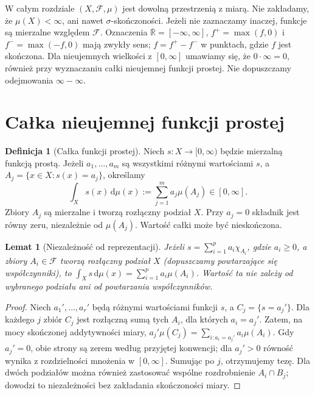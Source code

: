 \documentclass[11pt,a4paper,oneside]{book}
\numberwithin{equation}{chapter}
\theoremstyle{plain}
\newtheorem{lemat}[twierdzenie]{Lemat}
\theoremstyle{definition}
\newtheorem{definicja}[twierdzenie]{Definicja}
\theoremstyle{remark}
\begin{document}
W całym rozdziale $(X,\mathcal F,\mu)$ jest dowolną przestrzenią
z miarą. Nie zakładamy, że $\mu(X)<\infty$, ani nawet
$\sigma$-skończoności. Jeżeli nie zaznaczamy inaczej,
funkcje są mierzalne względem $\mathcal F$.
Oznaczenia $\overline{\mathbb R}=[-\infty,\infty]$,
$f^+=\max(f,0)$ i $f^-=\max(-f,0)$ mają zwykły sens;
$f=f^+-f^-$ w punktach, gdzie $f$ jest skończona.
Dla nieujemnych wielkości z $[0,\infty]$ umawiamy się,
że $0\cdot\infty=0$, również przy wyznaczaniu całki
nieujemnej funkcji prostej. Nie dopuszczamy odejmowania
$\infty-\infty$.

\section{Całka nieujemnej funkcji prostej}

\begin{definicja}[Całka funkcji prostej]
\label{def:integral-simple}
Niech $s:X\to[0,\infty)$ będzie mierzalną funkcją prostą.
Jeżeli $a_1,\ldots,a_m$ są wszystkimi różnymi wartościami $s$,
a $A_j=\{x\in X:s(x)=a_j\}$, określamy
\begin{equation}\label{eq:simple-integral}
\int_X s(x)\,\mathrm d\mu(x)
:=\sum_{j=1}^{m}a_j\mu(A_j)\in[0,\infty].
\end{equation}
Zbiory $A_j$ są mierzalne i tworzą rozłączny podział $X$.
Przy $a_j=0$ składnik jest równy zeru, niezależnie od
$\mu(A_j)$. Wartość całki może być nieskończona.
\end{definicja}

\begin{lemat}[Niezależność od reprezentacji]
\label{lem:simple-refinement}
Jeżeli $s=\sum_{i=1}^p a_i\chi_{A_i}$, gdzie
$a_i\ge0$, a zbiory $A_i\in\mathcal F$ tworzą
rozłączny podział $X$ (dopuszczamy powtarzające się
współczynniki), to
$\int_Xs\,\mathrm d\mu(x)=\sum_{i=1}^pa_i\mu(A_i)$.
Wartość ta nie zależy od wybranego podziału ani od
powtarzania współczynników.
\end{lemat}
\begin{proof}
Niech $a_1',\ldots,a_r'$ będą różnymi wartościami
funkcji $s$, a $C_j=\{s=a_j'\}$. Dla każdego $j$
zbiór $C_j$ jest rozłączną sumą tych $A_i$, dla których
$a_i=a_j'$. Zatem, na mocy skończonej addytywności miary,
$a_j'\mu(C_j)=\sum_{i:a_i=a_j'}a_i\mu(A_i)$.
Gdy $a_j'=0$, obie strony są zerem według przyjętej
konwencji; dla $a_j'>0$ równość wynika z rozdzielności
mnożenia w $[0,\infty]$. Sumując po $j$, otrzymujemy
tezę. Dla dwóch podziałów można również zastosować
wspólne rozdrobnienie $A_i\cap B_j$; dowodzi to
niezależności bez zakładania skończoności miary.
\end{proof}
\end{document}
